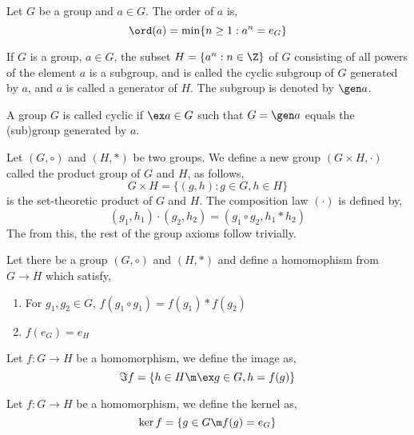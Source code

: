 \documentclass{article}
\begin{document}
\begin{ndefi}
  Let $G$ be a group and $a \in G$. The order of $a$ is,
  $$ \ord (a) = \min \{n \ge 1 : a^n = e_G\} $$
\end{ndefi}

\begin{ndefi}[Generator]
  If $G$ is a group, $a\in G$, the subset $H = \{a^n : n \in \Z\}$ of $G$ consisting of all powers of the element $a$ is a subgroup, and is called the cyclic subgroup of $G$ generated by $a$, and $a$ is called a generator of $H$. The subgroup is denoted by $\gen a$.
\end{ndefi}

\begin{ndefi}
  A group $G$ is called cyclic if $\ex a \in G$ such that $G = \gen a$ equals the (sub)group generated by $a$.
\end{ndefi}

\begin{ndefi}
  Let $(G, \circ)$ and $(H, *)$ be two groups. We define a new group $(G \times H, \cdot)$ called the product group of $G$ and $H$, as follows,
  $$ G \times H = \{(g, h) : g \in G, h \in H\} $$
  is the set-theoretic product of $G$ and $H$. The composition law $(\cdot)$ is defined by,
  $$ (g_1, h_1) \cdot (g_2, h_2) = (g_1 \circ g_2, h_1 * h_2) $$
  The from this, the rest of the group axioms follow trivially.
\end{ndefi}

\begin{ndefi}[Homomophism]
  Let there be a group $(G, \circ)$ and $(H, *)$ and define a homomophism from $G \to H$ which satisfy,
  \begin{enumerate}
    \item For $g_1, g_2 \in G$, $f(g_1 \circ g_1) = f(g_1) * f(g_2)$
    \item $f(e_G) = e_H$
  \end{enumerate}
\end{ndefi}

\begin{ndefi}[Image]
  Let $f : G \to H$ be a homomorphism, we define the image as,
  $$ \Im f = \{ h \in H \m \ex g \in G, h = f(g)\} $$
\end{ndefi}

\begin{ndefi}[Kernel]
  Let $f : G \to H$ be a homomorphism, we define the kernel as,
  $$ \ker f = \{ g \in G \m f(g) = e_G \} $$
\end{ndefi}
\end{document}
